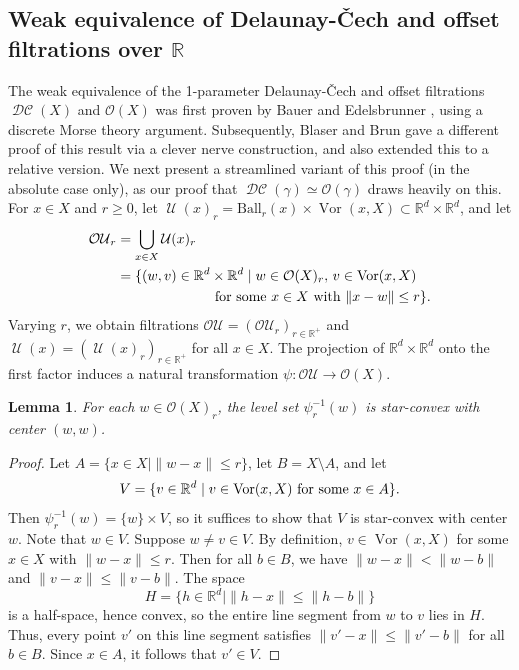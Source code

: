 \documentclass[11pt]{amsart}
\newcommand{\R}{\mathbb{R}} %
\newcommand{\Ball}{\text{Ball}}
\DeclareMathOperator{\Vor}{Vor}
\DeclareMathOperator{\TelVO}{\mathcal U}
\DeclareMathOperator{\DelCech}{\mathcal{DC}}
\newcommand{\Offset}[0]{\mathcal{O}}
\theoremstyle{plain}
\newtheorem{lemma}[theorem]{Lemma}
\theoremstyle{definition}
\theoremstyle{remark}
\begin{document}
\subsection{Weak equivalence of Delaunay-\v Cech and offset filtrations over $\R$}\label{Sec:WE_DelCech_1_param}
The weak equivalence of the 1-parameter Delaunay-\v Cech and offset filtrations $\DelCech(X)$ and $\Offset(X)$ was first proven by Bauer and Edelsbrunner \cite{bauer2017morse}, using a discrete Morse theory argument.  Subsequently, Blaser and Brun \cite{blaser2022relative} gave a different proof of this result via a clever nerve construction, and also extended this to a relative version.  We next present a streamlined variant of this proof (in the absolute case only), as our proof that $\DelCech(\gamma)\simeq \Offset(\gamma)$ draws heavily on this.
%
For $x\in X$ and $r\geq 0$, let $\TelVO(x)_r= \Ball_r(x) \times \Vor(x,X)\subset \R^d\times \R^d$, and let 
\begin{align*}
\mathcal{OU}_r &= \bigcup_{x\in X} \mathcal{U}(x)_r \\
               &= \{(w,v)\in \R^d\times \R^d \mid w\in \Offset(X)_r,\, v\in \Vor(x,X) \\
               &\phantom{{}= \qquad \qquad \qquad} \textup{for some }x\in X\textup{ with }\|x-w\|\leq r\}.
\end{align*}
Varying $r$, we obtain filtrations $\mathcal{OU}=(\mathcal{OU}_r)_{r\in \R^+}$ and $\TelVO(x)=(\TelVO(x)_r)_{r\in \R^+}$ for all  $x\in X$.  
The projection of $\R^d\times \R^d$ onto the first factor induces a natural transformation $\psi\colon \mathcal{OU}\to \Offset(X)$.
%
\begin{lemma}\label{Lem:Star_Convex}
For each $w\in \Offset(X)_r$, the level set $\psi^{-1}_r(w)$ is star-convex with center $(w,w)$.  
\end{lemma}
%
\begin{proof}
Let $A=\{x\in X\mid \|w-x\|\leq r\}$, let $B=X\setminus A$, and let \[V=\{v\in \R^d \mid v\in \Vor(x,X)\textup{ for some }x\in A\}.\]
  Then $\psi^{-1}_r(w)=\{w\}\times V$, so it suffices to show that $V$ is star-convex with center $w$.  Note that $w\in V$.  Suppose $w\ne v\in V$.   By definition, $v\in \Vor(x,X)$ for some $x\in X$ with $\|w-x\|\leq r$. Then for all $b\in B$, we have $\|w-x\|<\|w-b\|$ and $\|v-x\|\leq \|v-b\|$.  The space 
 \[H=\{h\in \R^d\mid \|h-x\|\leq \|h-b\|\}\] is a half-space, hence convex, so the entire line segment from $w$ to $v$ lies in $H$.  Thus, every point $v'$ on this line segment satisfies $\|v'-x\|\leq \|v'-b\|$ for all $b\in B$.  Since $x\in A$, it follows that $v'\in V$.  
\end{proof}
\end{document}
